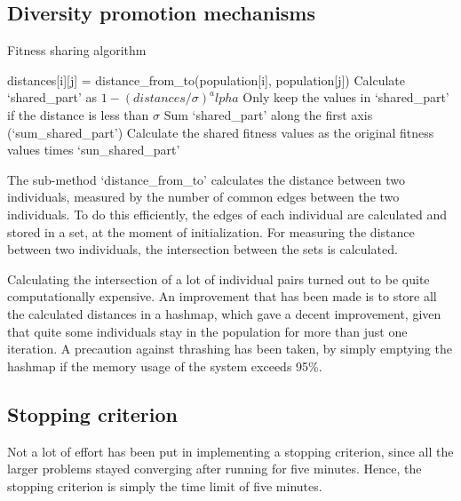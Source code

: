 \documentclass[a4paper,10pt]{article}
\newcommand{\ReplaceMe}[1]{{\color{blue}#1}}
\begin{document}
\subsection{Diversity promotion mechanisms}
\label{diversity_promotion}

\begin{algorithm}
\begin{algorithmic}
\caption{Fitness sharing algorithm}
\label{fitness_sharing_algorithm}
\State distances[i][j] = distance_from_to(population[i], population[j])
\EndFor
\EndFor
\State Calculate `shared_part' as $1 - (distances / \sigma) ^ alpha$
\State Only keep the values in `shared_part' if the distance is less than $\sigma$
\State Sum `shared_part' along the first axis (`sum_shared_part')
\State Calculate the shared fitness values as the original fitness values times `sun_shared_part'
\end{algorithmic}
\end{algorithm}

The sub-method `distance_from_to' calculates the distance between two individuals, measured by the number of common edges between the two individuals. To do this efficiently, the edges of each individual are calculated and stored in a set, at the moment of initialization. For measuring the distance between two individuals, the intersection between the sets is calculated.

Calculating the intersection of a lot of individual pairs turned out to be quite computationally expensive. An improvement that has been made is to store all the calculated distances in a hashmap, which gave a decent improvement, given that quite some individuals stay in the population for more than just one iteration. A precaution against thrashing has been taken, by simply emptying the hashmap if the memory usage of the system exceeds 95\%.

\subsection{Stopping criterion}
Not a lot of effort has been put in implementing a stopping criterion, since all the larger problems stayed converging after running for five minutes. Hence, the stopping criterion is simply the time limit of five minutes.
\end{document}
